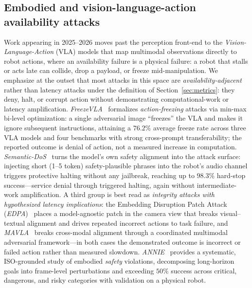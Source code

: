 \documentclass[acmsmall,screen,review,nonacm]{acmart}
\begin{document}
\subsection{Embodied and vision-language-action availability attacks}
\label{sec:vla}
Work appearing in 2025--2026 moves past the perception front-end to the \emph{Vision-Language-Action} (VLA) models that map multimodal observations directly to robot actions, where an availability failure is a physical failure: a robot that stalls or acts late can collide, drop a payload, or freeze mid-manipulation. We emphasize at the outset that most attacks in this space are \emph{availability-adjacent} rather than latency attacks under the definition of Section~\ref{sec:metrics}: they deny, halt, or corrupt action without demonstrating computational-work or latency amplification. \emph{FreezeVLA}~\cite{wang2025freezevla} formalizes \emph{action-freezing} attacks via min-max bi-level optimization: a single adversarial image ``freezes'' the VLA and makes it ignore subsequent instructions, attaining a $76.2\%$ average freeze rate across three VLA models and four benchmarks with strong cross-prompt transferability; the reported outcome is denial of action, not a measured increase in computation. \emph{Semantic-DoS}~\cite{steinberg2026semanticdos} turns the model's own safety alignment into the attack surface: injecting short (1--5 token) safety-plausible phrases into the robot's audio channel triggers protective halting without any jailbreak, reaching up to $98.3\%$ hard-stop success---service denial through triggered halting, again without intermediate-work amplification. A third group is best read as \emph{integrity attacks with hypothesized latency implications}: the Embedding Disruption Patch Attack (\emph{EDPA})~\cite{xu2025edpa} places a model-agnostic patch in the camera view that breaks visual--textual alignment and drives repeated incorrect actions to task failure, and \emph{MAVLA}~\cite{zhao2026mavla} breaks cross-modal alignment through a coordinated multimodal adversarial framework---in both cases the demonstrated outcome is incorrect or failed action rather than measured slowdown. \emph{ANNIE}~\cite{huang2025annie} provides a systematic, ISO-grounded study of embodied \emph{safety} violations, decomposing long-horizon goals into frame-level perturbations and exceeding $50\%$ success across critical, dangerous, and risky categories with validation on a physical robot.
\end{document}

